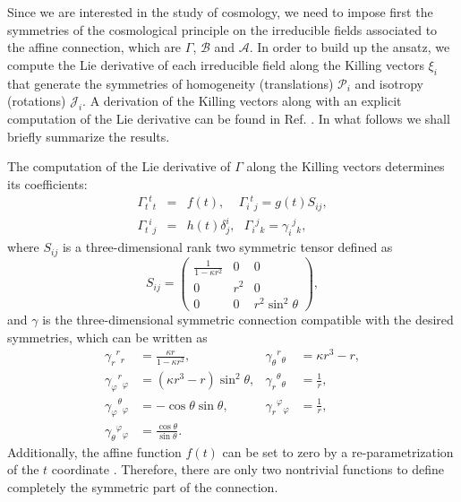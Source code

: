 \documentclass[epj]{svjour}
\providecommand{\ctG}[3]{\Gamma_{#1}{}^{#2}{}_{#3}}
\providecommand{\ctg}[3]{\gamma_{#1}{}^{#2}{}_{#3}}
\begin{document}
Since we are interested in the study of cosmology, we need to impose first the symmetries of the cosmological principle on 
the irreducible fields associated to the affine connection, which are $\Gamma$, $\mathcal{B}$ and $\mathcal{A}$. 
In order to build up the ansatz, we compute the Lie derivative of each irreducible field along the Killing vectors $\xi_i$ that generate the symmetries of homogeneity (translations) $\mathcal{P}_i$ and isotropy (rotations) $\mathcal{J}_i$. 
A derivation of the Killing vectors along with an explicit computation of the Lie derivative can be found 
in Ref. \cite{Castillo-Felisola17}. In what follows we shall briefly summarize the results.

The computation of the Lie derivative of $\Gamma$ along the Killing vectors determines its coefficients: 
\begin{eqnarray}
    \label{G_ansatz}
    \ctG{t}{t}{t} & =& f(t), \ \ \ \ \ \ctG{i}{t}{j}  = g(t) S_{i j}, \\
    \ctG{t}{i}{j} &=& h(t) \delta^{i}_{j} , \ \ \ \ctG{i}{j}{k}  = \ctg{i}{j}{k}, \nonumber
\end{eqnarray}
where $S_{ij}$ is a three-dimensional rank two symmetric tensor defined as 
\begin{equation}\label{eq:Sij}
    S_{i j}=\left(\begin{array}{ccc}
    \frac{1}{1-\kappa r^2} & 0 & 0 \\
    0 & r^2 & 0 \\
    0 & 0 & r^2 \sin ^2 \theta
    \end{array}\right),
\end{equation}
and $\gamma$ is the three-dimensional symmetric connection compatible with the desired symmetries, which can be written as
\begin{align*}
    \ctg{r}{r}{r} & = \frac{\kappa r}{1 - \kappa r^2}, & \ctg{\theta}{r}{\theta} & = \kappa r^3 - r, \\
    \ctg{\varphi}{r}{\varphi} & = \left(\kappa r^3 - r\right)\sin^2\theta, & \ctg{r}{\theta}{\theta} & = \frac{1}{r}, \\
    \ctg{\varphi}{\theta}{\varphi} & = -\cos\theta\sin\theta, & \ctg{r}{\varphi}{\varphi} & = \frac{1}{r}, \\
    \ctg{\theta}{\varphi}{\varphi} & = \frac{\cos \theta}{\sin \theta}.
\end{align*}
Additionally, the affine function $f(t)$ can be set to zero by a re-parametrization of the $t$ coordinate \cite{Castillo_Felisola_2022_EPJC}. 
Therefore, there are only two nontrivial functions to define completely the symmetric part of the connection.
\end{document}
